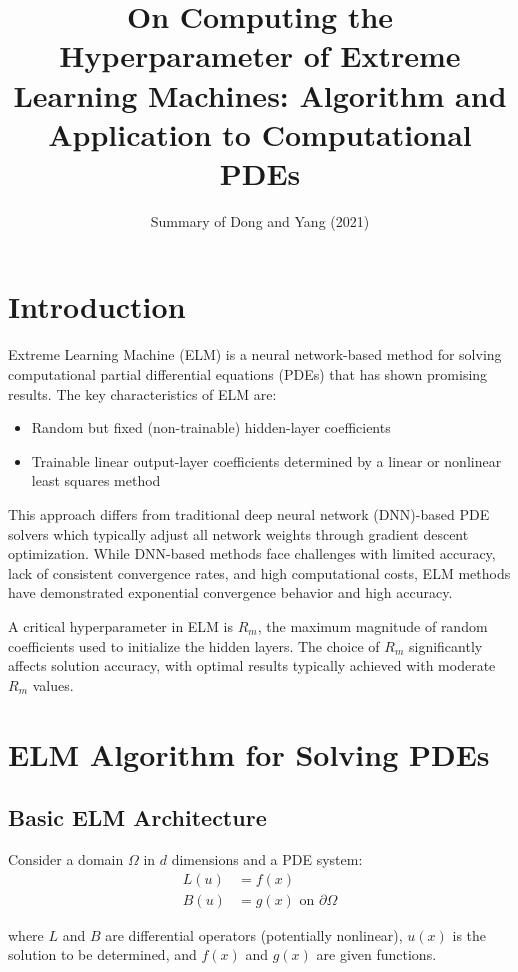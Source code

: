 \documentclass[11pt,a4paper]{article}
\title{On Computing the Hyperparameter of Extreme Learning Machines: Algorithm and Application to Computational PDEs}
\author{Summary of Dong and Yang (2021)}
\date{}
\begin{document}
\maketitle

\section{Introduction}

Extreme Learning Machine (ELM) is a neural network-based method for solving computational partial differential equations (PDEs) that has shown promising results. The key characteristics of ELM are:

\begin{itemize}
    \item Random but fixed (non-trainable) hidden-layer coefficients
    \item Trainable linear output-layer coefficients determined by a linear or nonlinear least squares method
\end{itemize}

This approach differs from traditional deep neural network (DNN)-based PDE solvers which typically adjust all network weights through gradient descent optimization. While DNN-based methods face challenges with limited accuracy, lack of consistent convergence rates, and high computational costs, ELM methods have demonstrated exponential convergence behavior and high accuracy.

A critical hyperparameter in ELM is $R_m$, the maximum magnitude of random coefficients used to initialize the hidden layers. The choice of $R_m$ significantly affects solution accuracy, with optimal results typically achieved with moderate $R_m$ values.

\section{ELM Algorithm for Solving PDEs}

\subsection{Basic ELM Architecture}

Consider a domain $\Omega$ in $d$ dimensions and a PDE system:
\begin{align}
    L(u) &= f(x) \\
    B(u) &= g(x) \text{ on } \partial\Omega
\end{align}

where $L$ and $B$ are differential operators (potentially nonlinear), $u(x)$ is the solution to be determined, and $f(x)$ and $g(x)$ are given functions.
\end{document}

